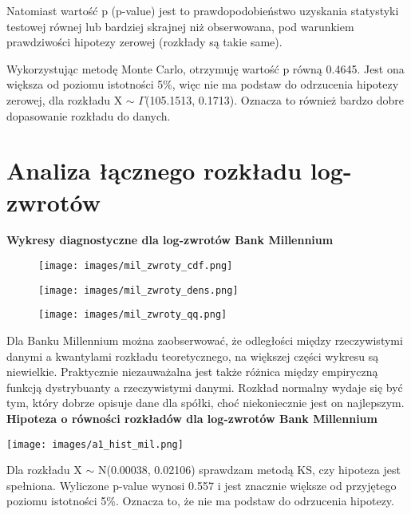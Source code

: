 \documentclass[12pt]{article}
\begin{document}
Natomiast wartość p (p-value) jest to prawdopodobieństwo uzyskania statystyki testowej równej lub bardziej skrajnej niż obserwowana, pod warunkiem prawdziwości hipotezy zerowej (rozkłady są takie same).
\vspace{12pt}

Wykorzystując metodę Monte Carlo, otrzymuję wartość p równą 0.4645. Jest ona większa od poziomu istotności 5\%, więc nie ma podstaw do odrzucenia hipotezy zerowej, dla rozkładu X $\sim$ $\Gamma$(105.1513, 0.1713). Oznacza to również bardzo dobre dopasowanie rozkładu do danych.

\clearpage

\section{Analiza łącznego rozkładu log-zwrotów}
{\bf \large Wykresy diagnostyczne dla log-zwrotów Bank Millennium}
\begin{figure}[ht]
  \begin{minipage}[b]{0.48\textwidth}
    \centering
    \texttt{[image: images/mil\_zwroty\_cdf.png]}
  \end{minipage}
  \hfill
  \begin{minipage}[b]{0.48\textwidth}
    \centering
    \texttt{[image: images/mil\_zwroty\_dens.png]}
  \end{minipage}

  \vspace{0.5 cm}
  
  \begin{minipage}[t]{\textwidth}
    \centering
    \texttt{[image: images/mil\_zwroty\_qq.png]}
  \end{minipage}
\end{figure}

Dla Banku Millennium można zaobserwować, że odległości między rzeczywistymi danymi a kwantylami rozkładu teoretycznego, na większej części wykresu są niewielkie. Praktycznie niezauważalna jest także różnica między empiryczną funkcją dystrybuanty a rzeczywistymi danymi. Rozkład normalny wydaje się być tym, który dobrze opisuje dane dla spółki, choć niekoniecznie jest on najlepszym.    
\clearpage
{\bf \large Hipoteza o równości rozkładów dla log-zwrotów Bank Millennium}

\texttt{[image: images/a1\_hist\_mil.png]}

Dla rozkładu X \(\sim \) N(0.00038, 0.02106) sprawdzam metodą KS, czy hipoteza jest spełniona. 
Wyliczone p-value wynosi 0.557 i jest znacznie większe od przyjętego poziomu istotności 5\%. Oznacza to, że nie ma podstaw do odrzucenia hipotezy.
\clearpage
\pagebreak
\end{document}
